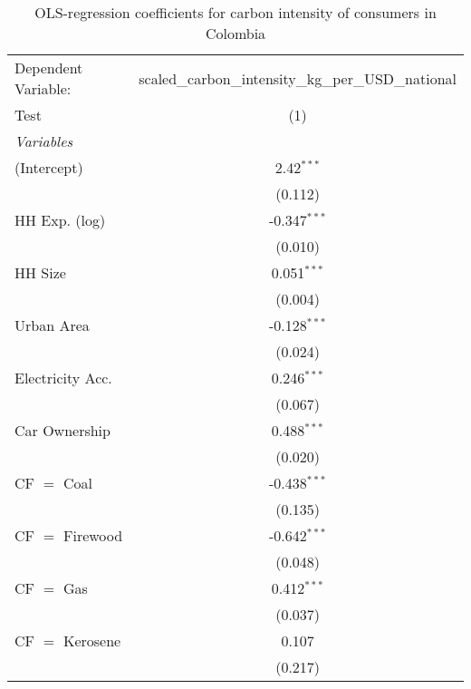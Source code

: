 
\begin{table}[htbp!]
   \centering
   \small
   \begin{adjustbox}{width = 1\textwidth, max height = 0.95\textheight, center}
      \begin{threeparttable}[b]
         \caption{\label{tab:OLS_1_COL} OLS-regression coefficients for carbon intensity of consumers in Colombia}
         \begin{tabular}{lc}
            \tabularnewline \midrule \midrule
            Dependent Variable: & scaled\_carbon\_intensity\_kg\_per\_USD\_national\\        
            Test                & (1)\\  
            \midrule
            \emph{Variables}\\
            (Intercept)         & 2.42$^{***}$\\   
                                & (0.112)\\   
            HH Exp. (log)       & -0.347$^{***}$\\   
                                & (0.010)\\   
            HH Size             & 0.051$^{***}$\\   
                                & (0.004)\\   
            Urban Area          & -0.128$^{***}$\\   
                                & (0.024)\\   
            Electricity Acc.    & 0.246$^{***}$\\   
                                & (0.067)\\   
            Car Ownership       & 0.488$^{***}$\\   
                                & (0.020)\\   
            CF $=$ Coal         & -0.438$^{***}$\\   
                                & (0.135)\\   
            CF $=$ Firewood     & -0.642$^{***}$\\   
                                & (0.048)\\   
            CF $=$ Gas          & 0.412$^{***}$\\   
                                & (0.037)\\   
            CF $=$ Kerosene     & 0.107\\   
                                & (0.217)\\   

\end{tabular}
\end{threeparttable}
\end{adjustbox}
\end{table}
